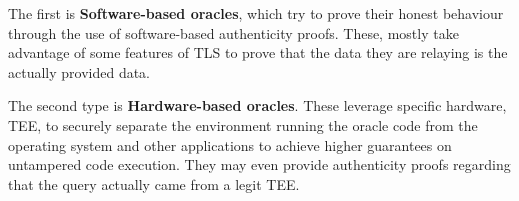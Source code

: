 \begin{table}[]
  \centering
  \caption{Summary of oracle projects/research.}
  \label{oracle-summary}
\end{table}

The first is \textbf{Software-based oracles}, which try to prove their honest behaviour through the use of software-based authenticity proofs. These, mostly take advantage of some features of TLS to prove that the data they are relaying is the actually provided data.

The second type is \textbf{Hardware-based oracles}. These leverage specific hardware, TEE, to securely separate the environment running the oracle code from the operating system and other applications to achieve higher guarantees on untampered code execution. They may even provide authenticity proofs regarding that the query actually came from a legit TEE.

